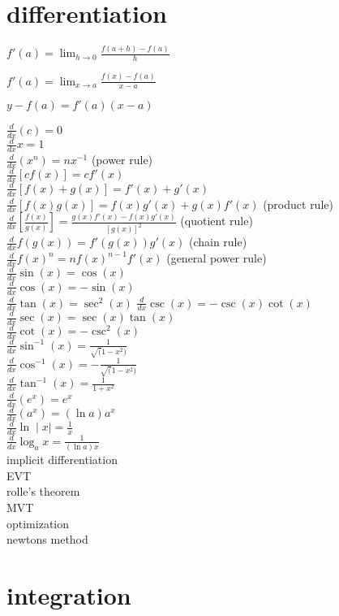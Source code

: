 \documentclass{article}
\begin{document}
\newpage
\section*{differentiation}

\begin{center} $f'(a) = \lim_{h \to 0}\frac{f(a + h) - f(a)}{h}$ \end{center}
\begin{center} $f'(a) = \lim_{x \to a}\frac{f(x) - f(a)}{x - a}$ \end{center}
\begin{center} $y - f(a) = f'(a)(x - a)$ \end{center}

$\frac{d}{dx}(c) = 0$\\
$\frac{d}{dx}x = 1$\\
$\frac{d}{dx}(x^n) = nx^{-1}$ (power rule)\\
$\frac{d}{dx}[cf(x)] = cf'(x)$\\
$\frac{d}{dx}[f(x)+g(x)] = f'(x) + g'(x)$\\
$\frac{d}{dx}[f(x)g(x)] = f(x)g'(x) + g(x)f'(x)$ (product rule)\\
$\frac{d}{dx}[\frac{f(x)}{g(x)}] = \frac{g(x)f'(x) - f(x)g'(x)}{[g(x)]^2}$ (quotient rule)\\
$\frac{d}{dx}f(g(x)) = f'(g(x))g'(x)$ (chain rule)\\
$\frac{d}{dx}f(x)^n = nf(x)^{n-1}f'(x)$ (general power rule)\\
$\frac{d}{dx}\sin(x) = \cos(x)$\\ 
$\frac{d}{dx}\cos(x) = -\sin(x)$\\
$\frac{d}{dx}\tan(x) = \sec^2(x)$
$\frac{d}{dx}\csc(x) = -\csc(x)\cot(x)$\\
$\frac{d}{dx}\sec(x) = \sec(x)\tan(x)$\\
$\frac{d}{dx}\cot(x) = -\csc^2(x)$\\
$\frac{d}{dx}\sin^{-1}(x) = \frac{1}{\sqrt(1 - x^2)}$\\
$\frac{d}{dx}\cos^{-1}(x) = -\frac{1}{\sqrt(1 - x^2)}$\\
$\frac{d}{dx}\tan^{-1}(x) = \frac{1}{1 + x^2}$\\
$\frac{d}{dx}(e^x) = e^x$\\
$\frac{d}{dx}(a^x) = (\ln a)a^x$\\
$\frac{d}{dx}\ln\mid x\mid = \frac{1}{x}$\\
$\frac{d}{dx}\log_ax = \frac{1}{(\ln a)x}$\\


implicit differentiation\\
EVT\\
rolle's theorem\\
MVT\\
optimization\\
newtons method\\

\section*{integration}
\end{document}
